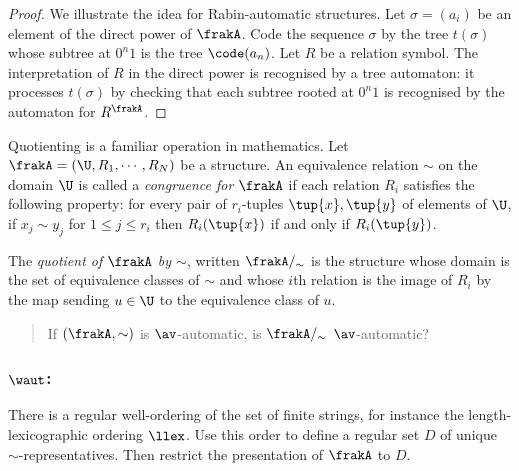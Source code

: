 \begin{proof}
We illustrate the idea for Rabin-automatic structures.
Let $\sigma = (a_i)$ be an element of the direct power of $\frakA$.
Code the sequence $\sigma$ by the tree $t(\sigma)$ whose subtree at $0^n1$ is the tree $\code(a_n)$.
Let $R$ be a relation symbol. The interpretation of $R$ in the direct power is recognised by a tree automaton: it  processes $t(\sigma)$ by checking
that each subtree rooted at $0^n1$ is recognised by the automaton for $R^\frakA$.
\end{proof}

Quotienting is a familiar operation in mathematics.
Let $\frakA = (\U,R_1,\cdots,R_N)$ be a structure.
An equivalence relation $\sim$ on the domain $\U$ is called a {\em congruence for $\frakA$} if each relation $R_i$ satisfies the following property:
for every pair of $r_i$-tuples $\tup{x},\tup{y}$ of elements of $\U$, if $x_j \sim y_j$ for $1 \leq j \leq r_i$ then $R_i(\tup{x})$ if and only if $R_i(\tup{y})$.

The {\em quotient of $\frakA$ by $\sim$}, written $\frakA/_\sim$ is the structure whose domain is the set of equivalence classes of $\sim$ and whose $i$th relation
is the image of $R_i$ by the map sending $u \in \U$ to the equivalence class of $u$.

\begin{quote}
If $(\frakA,\sim)$ is $\av$-automatic, is $\frakA/_\sim$ $\av$-automatic?
\end{quote}

\subsubsection*{$\waut$:}
There is a regular well-ordering of the set of finite strings, for instance the length-lexicographic
ordering $\llex$. Use this order to define a regular set $D$ of unique $\sim$-representatives.
Then restrict the presentation of $\frakA$ to $D$.

